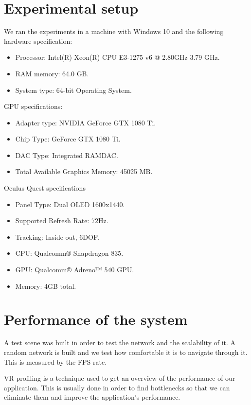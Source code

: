 \section{Experimental setup}
We ran the experiments in a machine with Windows 10 and the following hardware specification:
\begin{itemize}
  \item Processor: Intel(R) Xeon(R) CPU E3-1275 v6 @ 2.80GHz 3.79 GHz.
  \item RAM memory: 64.0 GB.
  \item System type: 64-bit Operating System.
\end{itemize}

GPU specifications:
\begin{itemize}
  \item Adapter type: NVIDIA GeForce GTX 1080 Ti.
  \item Chip Type: GeForce GTX 1080 Ti.
  \item DAC Type: Integrated RAMDAC.
  \item Total Available Graphics Memory: 45025 MB.
\end{itemize}

Oculus Quest specifications
\begin{itemize}
  \item Panel Type: Dual OLED 1600x1440.
  \item Supported Refresh Rate: 72Hz.
  \item Tracking: Inside out, 6DOF.
  \item CPU: Qualcomm® Snapdragon 835.
  \item GPU: Qualcomm® Adreno™ 540 GPU.
  \item Memory: 4GB total.
\end{itemize}

\section{Performance of the system}
A test scene was built in order to test the network and the scalability of it. A random network is built and we test how comfortable it is to navigate through it. This is measured by the FPS rate.

VR profiling is a technique used to get an overview of the performance of our application. This is usually done in order to find bottlenecks so that we can eliminate them and improve the application's performance.

